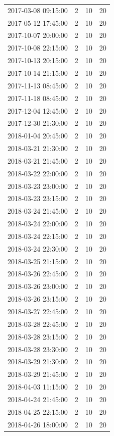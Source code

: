 \begin{tabular}{lrrr}
2017-03-08 09:15:00 & 2 & 10 & 20 \\
2017-05-12 17:45:00 & 2 & 10 & 20 \\
2017-10-07 20:00:00 & 2 & 10 & 20 \\
2017-10-08 22:15:00 & 2 & 10 & 20 \\
2017-10-13 20:15:00 & 2 & 10 & 20 \\
2017-10-14 21:15:00 & 2 & 10 & 20 \\
2017-11-13 08:45:00 & 2 & 10 & 20 \\
2017-11-18 08:45:00 & 2 & 10 & 20 \\
2017-12-04 12:45:00 & 2 & 10 & 20 \\
2017-12-30 21:30:00 & 2 & 10 & 20 \\
2018-01-04 20:45:00 & 2 & 10 & 20 \\
2018-03-21 21:30:00 & 2 & 10 & 20 \\
2018-03-21 21:45:00 & 2 & 10 & 20 \\
2018-03-22 22:00:00 & 2 & 10 & 20 \\
2018-03-23 23:00:00 & 2 & 10 & 20 \\
2018-03-23 23:15:00 & 2 & 10 & 20 \\
2018-03-24 21:45:00 & 2 & 10 & 20 \\
2018-03-24 22:00:00 & 2 & 10 & 20 \\
2018-03-24 22:15:00 & 2 & 10 & 20 \\
2018-03-24 22:30:00 & 2 & 10 & 20 \\
2018-03-25 21:15:00 & 2 & 10 & 20 \\
2018-03-26 22:45:00 & 2 & 10 & 20 \\
2018-03-26 23:00:00 & 2 & 10 & 20 \\
2018-03-26 23:15:00 & 2 & 10 & 20 \\
2018-03-27 22:45:00 & 2 & 10 & 20 \\
2018-03-28 22:45:00 & 2 & 10 & 20 \\
2018-03-28 23:15:00 & 2 & 10 & 20 \\
2018-03-28 23:30:00 & 2 & 10 & 20 \\
2018-03-29 21:30:00 & 2 & 10 & 20 \\
2018-03-29 21:45:00 & 2 & 10 & 20 \\
2018-04-03 11:15:00 & 2 & 10 & 20 \\
2018-04-24 21:45:00 & 2 & 10 & 20 \\
2018-04-25 22:15:00 & 2 & 10 & 20 \\
2018-04-26 18:00:00 & 2 & 10 & 20 \\

\end{tabular}
